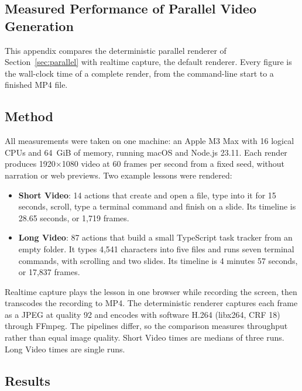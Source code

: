 \documentclass[11pt, a4paper]{article}
\begin{document}
\begin{appendices}

\section{Measured Performance of Parallel Video Generation}
\label{app:performance}

This appendix compares the deterministic parallel renderer of Section~\ref{sec:parallel} with realtime capture, the default renderer. Every figure is the wall-clock time of a complete render, from the command-line start to a finished MP4 file.

\subsection{Method}

All measurements were taken on one machine: an Apple M3 Max with 16 logical CPUs and 64~GiB of memory, running macOS and Node.js 23.11. Each render produces 1920$\times$1080 video at 60 frames per second from a fixed seed, without narration or web previews. Two example lessons were rendered:

\begin{itemize}
    \item \textbf{Short Video}: 14 actions that create and open a file, type into it for 15 seconds, scroll, type a terminal command and finish on a slide. Its timeline is 28.65 seconds, or 1,719 frames.
    \item \textbf{Long Video}: 87 actions that build a small TypeScript task tracker from an empty folder. It types 4,541 characters into five files and runs seven terminal commands, with scrolling and two slides. Its timeline is 4 minutes 57 seconds, or 17,837 frames.
\end{itemize}

Realtime capture plays the lesson in one browser while recording the screen, then transcodes the recording to MP4. The deterministic renderer captures each frame as a JPEG at quality 92 and encodes with software H.264 (libx264, CRF 18) through FFmpeg. The pipelines differ, so the comparison measures throughput rather than equal image quality. Short Video times are medians of three runs. Long Video times are single runs.

\subsection{Results}


\end{appendices}
\end{document}
